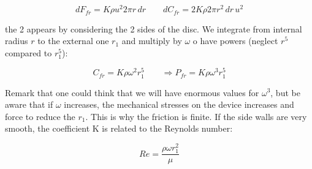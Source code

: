\begin{equation}
dF_{fr} = K\rho u^2 2\pi r \,dr \qquad dC_{fr} = 2K\rho 2\pi r^2\, dr\, u^2 
\end{equation}

the 2 appears by considering the 2 sides of the disc. We integrate from internal radius $r$ to the external one $r_1$ and multiply by $\omega$ o have powers (neglect $r^5$ compared to $r_1^5$): 

\begin{equation}
C_{fr} = K\rho \omega ^2 r_1^5 \qquad \Rightarrow P_{fr}= K\rho \omega ^3 r_1^5
\end{equation}

Remark that one could think that we will have enormous values for $\omega ^3$, but be aware that if $\omega$ increases, the mechanical stresses on the device increases and force to reduce the $r_1$. This is why the friction is finite. If the side walls are very smooth, the coefficient K is related to the Reynolds number: 

\begin{equation}
Re = \frac{\rho \omega r_1^2}{\mu}
\end{equation}

